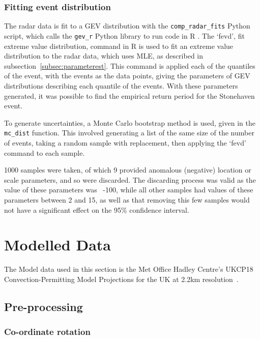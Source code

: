 \documentclass[12pt,a4paper]{report}
\begin{document}
\subsubsection{Fitting event distribution}

The radar data is fit to a GEV distribution with the \texttt{comp\_radar\_fits} Python script,
    which calls the \texttt{gev\_r} Python library to run code in R .
The `fevd', fit extreme value distribution,
    command in R is used to fit an extreme value distribution to the radar data,
    which uses MLE, as described in subsection~\ref{subsec:parameterest}.
This command is applied each of the quantiles of the event,
    with the events as the data points,
    giving the parameters of GEV distributions describing each quantile of the events.
With these parameters generated,
     it was possible to find the empirical return period for the Stonehaven event.

To generate uncertainties,
    a Monte Carlo bootstrap method is used,
    given in the \texttt{mc\_dist} function.
This involved generating a list of the same size of the number of events,
    taking a random sample with replacement,
    then applying the `fevd' command to each sample.

1000 samples were taken,
    of which 9 provided anomalous (negative) location or scale parameters,
    and so were discarded.
The discarding process was valid as the value of these parameters was ~-100,
    while all other samples had values of these parameters between 2 and 15,
    as well as that removing this few samples would not have a significant effect on the 95\% confidence interval.

\section{Modelled Data}\label{sec:model}

The Model data used in this section is
    the Met Office Hadley Centre's UKCP18 Convection-Permitting Model Projections for the UK at 2.2km resolution~\cite{model_data}.

\subsection{Pre-processing}\label{subsec:preprocess}

\subsubsection{Co-ordinate rotation}
\end{document}
